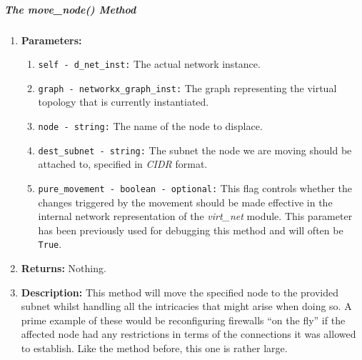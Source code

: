     \subparagraph{The move\_node() Method}
        \begin{enumerate}
            \item \textbf{Parameters:}
            \begin{enumerate}
                \item \texttt{self - d\_net\_inst:} The actual network instance.
                \item \texttt{graph - networkx\_graph\_inst:} The graph representing the virtual topology that is currently instantiated.
                \item \texttt{node - string:} The name of the node to displace.
                \item \texttt{dest\_subnet - string:} The subnet the node we are moving should be attached to, specified in \textit{CIDR} format.
                \item \texttt{pure\_movement - boolean - optional:} This flag controls whether the changes triggered by the movement should be made effective in the internal network representation of the \textit{virt\_net} module. This parameter has been previously used for debugging this method and will often be \texttt{True}.
            \end{enumerate}
            \item \textbf{Returns:} Nothing.
            \item \textbf{Description:} This method will move the specified node to the provided subnet whilst handling all the intricacies that might arise when doing so. A prime example of these would be reconfiguring firewalls ``on the fly'' if the affected node had any restrictions in terms of the connections it was allowed to establish. Like the method before, this one is rather large.
        \end{enumerate}
